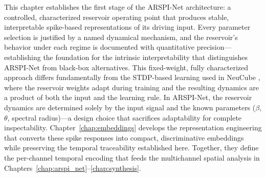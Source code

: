 This chapter establishes the first stage of the ARSPI-Net architecture: a controlled, characterized reservoir operating point that produces stable, interpretable spike-based representations of its driving input. Every parameter selection is justified by a named dynamical mechanism, and the reservoir's behavior under each regime is documented with quantitative precision---establishing the foundation for the intrinsic interpretability that distinguishes ARSPI-Net from black-box alternatives. This fixed-weight, fully characterized approach differs fundamentally from the STDP-based learning used in NeuCube \cite{kasabov_neucube_2014}, where the reservoir weights adapt during training and the resulting dynamics are a product of both the input and the learning rule. In ARSPI-Net, the reservoir dynamics are determined solely by the input signal and the known parameters ($\beta$, $\theta$, spectral radius)---a design choice that sacrifices adaptability for complete inspectability. Chapter~\ref{chap:embeddings} develops the representation engineering that converts these spike responses into compact, discriminative embeddings while preserving the temporal traceability established here. Together, they define the per-channel temporal encoding that feeds the multichannel spatial analysis in Chapters~\ref{chap:arspi_net}--\ref{chap:synthesis}.